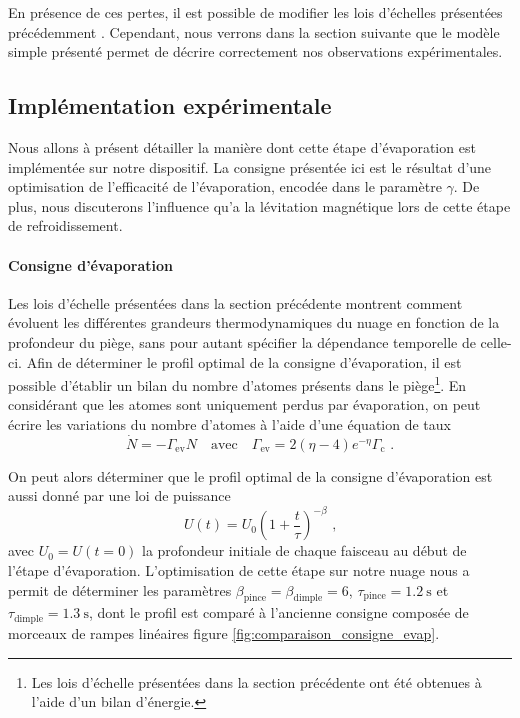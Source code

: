 En présence de ces pertes, il est possible de modifier les lois d'échelles présentées précédemment \citep{luiten1996kinetic}\citep{brantut2009manipulation}. Cependant, nous verrons dans la section suivante que le modèle simple présenté permet de décrire correctement nos observations expérimentales.



\subsection{Implémentation expérimentale}
Nous allons à présent détailler la manière dont cette étape d'évaporation est implémentée sur notre dispositif. La consigne présentée ici est le résultat d'une optimisation de l'efficacité de l'évaporation, encodée dans le paramètre $\gamma$. De plus, nous discuterons l'influence qu'a la lévitation magnétique lors de cette étape de refroidissement.



\paragraph*{Consigne d'évaporation}
Les lois d'échelle présentées dans la section précédente montrent comment évoluent les différentes grandeurs thermodynamiques du nuage en fonction de la profondeur du piège, sans pour autant spécifier la dépendance temporelle de celle-ci. Afin de déterminer le profil optimal de la consigne d'évaporation, il est possible d'établir un bilan du nombre d'atomes présents dans le piège\footnote{Les lois d'échelle présentées dans la section précédente ont été obtenues à l'aide d'un bilan d'énergie.}.
En considérant que les atomes sont uniquement perdus par évaporation, on peut écrire les variations du nombre d'atomes à l'aide d'une équation de taux \citep{luiten1996kinetic}\citep{o2001scaling}
\begin{equation}
\dot{N} = - \Gamma_{\mathrm{ev}} N \quad \text{avec} \quad \Gamma_{\mathrm{ev}}=2(\eta-4) e^{-\eta} \Gamma_{\mathrm{c}} \text{ .}
\end{equation}

On peut alors déterminer que le profil optimal de la consigne d'évaporation est aussi donné par une loi de puissance
\begin{equation}
U(t)=U_{\mathrm{0}} {\left( 1+\frac{t}{\tau}\right) }^{-\beta} \text{ ,}
\label{eq:nouvelle_consigne_evap}
\end{equation}
avec $U_{\mathrm{0}}=U(t=0)$ la profondeur initiale de chaque faisceau au début de l'étape d'évaporation. L'optimisation de cette étape sur notre nuage nous a permit de déterminer les paramètres $\beta_{\mathrm{pince}}=\beta_{\mathrm{dimple}}=6$, $\tau_{\mathrm{pince}}=\SI{1.2}{\second}$ et $\tau_{\mathrm{dimple}}=\SI{1.3}{\second}$, dont le profil est comparé à l'ancienne consigne composée de morceaux de rampes linéaires figure \ref{fig:comparaison_consigne_evap}.



